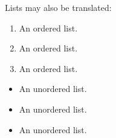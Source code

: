 Lists may also be translated:

\begin{enumerate}
  \item An ordered list.
  \item An ordered list.
  \item An ordered list.
\end{enumerate}

\begin{itemize}
  \item An unordered list.
  \item An unordered list.
  \item An unordered list.
\end{itemize}